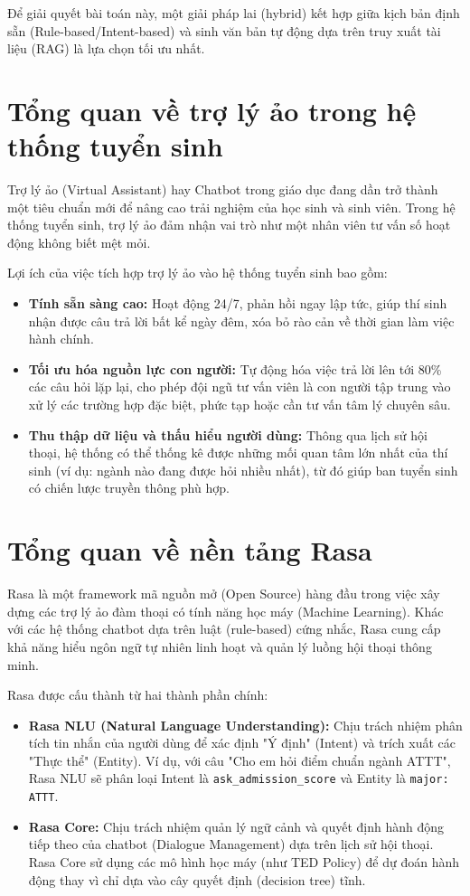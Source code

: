Để giải quyết bài toán này, một giải pháp lai (hybrid) kết hợp giữa kịch bản định sẵn (Rule-based/Intent-based) và sinh văn bản tự động dựa trên truy xuất tài liệu (RAG) là lựa chọn tối ưu nhất.

\section{Tổng quan về trợ lý ảo trong hệ thống tuyển sinh}
Trợ lý ảo (Virtual Assistant) hay Chatbot trong giáo dục đang dần trở thành một tiêu chuẩn mới để nâng cao trải nghiệm của học sinh và sinh viên. Trong hệ thống tuyển sinh, trợ lý ảo đảm nhận vai trò như một nhân viên tư vấn số hoạt động không biết mệt mỏi.

Lợi ích của việc tích hợp trợ lý ảo vào hệ thống tuyển sinh bao gồm:
\begin{itemize}
    \item \textbf{Tính sẵn sàng cao:} Hoạt động 24/7, phản hồi ngay lập tức, giúp thí sinh nhận được câu trả lời bất kể ngày đêm, xóa bỏ rào cản về thời gian làm việc hành chính.
    \item \textbf{Tối ưu hóa nguồn lực con người:} Tự động hóa việc trả lời lên tới 80\% các câu hỏi lặp lại, cho phép đội ngũ tư vấn viên là con người tập trung vào xử lý các trường hợp đặc biệt, phức tạp hoặc cần tư vấn tâm lý chuyên sâu.
    \item \textbf{Thu thập dữ liệu và thấu hiểu người dùng:} Thông qua lịch sử hội thoại, hệ thống có thể thống kê được những mối quan tâm lớn nhất của thí sinh (ví dụ: ngành nào đang được hỏi nhiều nhất), từ đó giúp ban tuyển sinh có chiến lược truyền thông phù hợp.
\end{itemize}

\section{Tổng quan về nền tảng Rasa}
Rasa là một framework mã nguồn mở (Open Source) hàng đầu trong việc xây dựng các trợ lý ảo đàm thoại có tính năng học máy (Machine Learning). Khác với các hệ thống chatbot dựa trên luật (rule-based) cứng nhắc, Rasa cung cấp khả năng hiểu ngôn ngữ tự nhiên linh hoạt và quản lý luồng hội thoại thông minh.

Rasa được cấu thành từ hai thành phần chính:
\begin{itemize}
    \item \textbf{Rasa NLU (Natural Language Understanding):} Chịu trách nhiệm phân tích tin nhắn của người dùng để xác định "Ý định" (Intent) và trích xuất các "Thực thể" (Entity). Ví dụ, với câu "Cho em hỏi điểm chuẩn ngành ATTT", Rasa NLU sẽ phân loại Intent là \texttt{ask\_admission\_score} và Entity là \texttt{major: ATTT}.
    \item \textbf{Rasa Core:} Chịu trách nhiệm quản lý ngữ cảnh và quyết định hành động tiếp theo của chatbot (Dialogue Management) dựa trên lịch sử hội thoại. Rasa Core sử dụng các mô hình học máy (như TED Policy) để dự đoán hành động thay vì chỉ dựa vào cây quyết định (decision tree) tĩnh.
\end{itemize}


